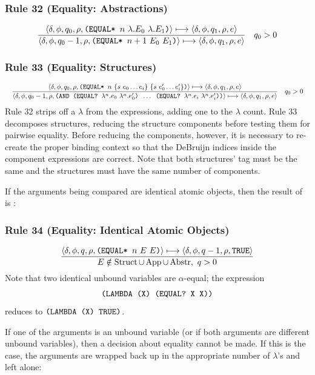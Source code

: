 \subsubsection*{Rule 32 (Equality: Abstractions)}
\[
\frac{
\cfg{\delta}{\phi}{q_0}{\rho}{\THOR{(EQUAL* }n\ \lambda.E_0\ \lambda.E_1\THOR{)}}\redsto
\cfg{\delta}{\phi}{q_1}{\rho}{e}
}{
\cfg{\delta}{\phi}{q_0-1}{\rho}{\THOR{(EQUAL* }n+1\ E_0\ E_1\THOR{)}}\redsto
\cfg{\delta}{\phi}{q_1}{\rho}{e}
}
\quad q_0>0
\]

\subsubsection*{Rule 33 (Equality: Structures)}
\[
\resizebox{\textwidth}{!}{$\displaystyle
\frac{
\cfg{\delta}{\phi}{q_0}{\rho}{\THOR{(EQUAL* }n\ \{s\ e_0\ldots e_i\}\ \{s\ e'_0\ldots e'_i\}\THOR{)}}\redsto
\cfg{\delta}{\phi}{q_1}{\rho}{e}
}{
\cfg{\delta}{\phi}{q_0-1}{\rho}{\THOR{(AND (EQUAL? }\lambda^n.e_0\ \lambda^n.e'_0\THOR{) }\ldots\THOR{ (EQUAL? }\lambda^n.e_i\ \lambda^n.e'_i\THOR{))}}\redsto
\cfg{\delta}{\phi}{q_1}{\rho}{e}
}
\quad q_0>0
$}
\]
Rule 32 strips off a \(\lambda\) from the expressions, adding one to the
\(\lambda\) count. Rule 33 decomposes structures, reducing the structure
components before testing them for pairwise equality. Before reducing the
components, however, it is necessary to re-create the proper binding context so
that the DeBruijn indices inside the component expressions are correct. Note
that both structures' tag must be the same and the structures must have the same
number of components.

If the arguments being compared are identical atomic objects, then the result of
 is :

\subsubsection*{Rule 34 (Equality: Identical Atomic Objects)}
\[
\frac{\langle \delta,\phi,q,\rho,\texttt{(EQUAL* }n\ E\ E\texttt{)}\rangle\longmapsto
      \langle \delta,\phi,q-1,\rho,\texttt{TRUE}\rangle}
     {E\notin\operatorname{Struct}\cup\operatorname{App}\cup\operatorname{Abstr},\ q>0}
\]
Note that two identical unbound variables are \(\alpha\)-equal; the expression
\[
\texttt{(LAMBDA (X) (EQUAL? X X))}
\]
reduces to \(\texttt{(LAMBDA (X) TRUE)}\).

If one of the arguments is an unbound variable (or if both arguments are
different unbound variables), then a decision about equality cannot be made. If
this is the case, the arguments are wrapped back up in the appropriate number of
\(\lambda\)'s and left alone:

